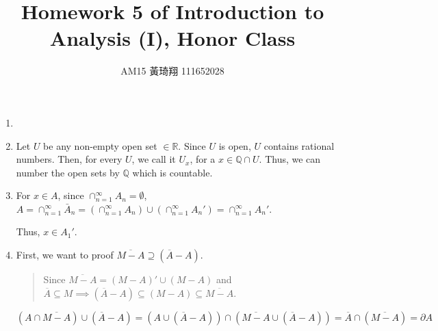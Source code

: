 \documentclass[12pt]{article}
\title{Homework 5 of Introduction to Analysis (I), Honor Class}
\author{AM15 黃琦翔 111652028}
\begin{document}
\maketitle
\begin{enumerate}
    \item 

    \item Let $U$ be any non-empty open set $\in \mathbb{R}$.
    Since $U$ is open, $U$ contains rational numbers.
    Then, for every $U$, we call it $U_x$, for a $x\in \mathbb{Q} \cap U$.
    Thus, we can number the open sets by $\mathbb{Q}$ which is countable.

    \item For $x \in A$, since $\cap_{n=1}^{\infty} A_n = \emptyset$, $A = \cap_{n=1}^{\infty} \bar{A}_n = (\cap_{n=1}^{\infty} A_n) \cup (\cap_{n=1}^{\infty} A_n') = \cap_{n=1}^{\infty} A_n'$.
    
    Thus, $x \in A_1'$.

    \item First, we want to proof $\overline{M-A} \supseteq (\overline{A} - A)$.
    \begin{quote}
        Since $\overline{M-A} = (M-A)' \cup (M-A)$ and $\overline{A} \subseteq M\implies (\overline{A} - A) \subseteq (M - A) \subseteq \overline{M-A}$.
    \end{quote}
    
    $(A \cap \overline{M-A}) \cup (\overline{A} - A) = (A\cup (\overline{A}-A)) \cap (\overline{M-A} \cup (\overline{A} - A)) = \overline{A} \cap (\overline{M-A}) = \partial A$ 
\end{enumerate}
\end{document}
